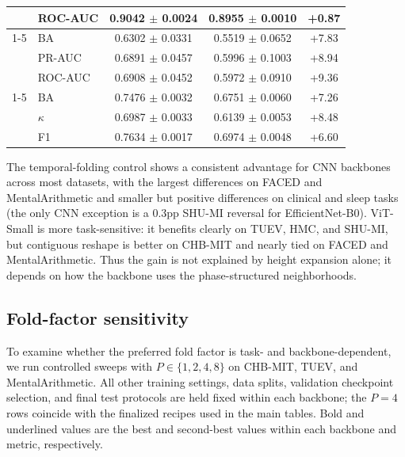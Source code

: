 \begin{table}[tbp]
\begin{tabular}{@{}l l c c c@{}}
 & ROC-AUC & 0.9042 $\pm$ 0.0024 & 0.8955 $\pm$ 0.0010 & +0.87 \\
\cmidrule(lr){1-5}
\multirow{3}{*}{SHU-MI} & BA & 0.6302 $\pm$ 0.0331 & 0.5519 $\pm$ 0.0652 & +7.83 \\
 & PR-AUC & 0.6891 $\pm$ 0.0457 & 0.5996 $\pm$ 0.1003 & +8.94 \\
 & ROC-AUC & 0.6908 $\pm$ 0.0452 & 0.5972 $\pm$ 0.0910 & +9.36 \\
\cmidrule(lr){1-5}
\multirow{3}{*}{HMC} & BA & 0.7476 $\pm$ 0.0032 & 0.6751 $\pm$ 0.0060 & +7.26 \\
 & $\kappa$ & 0.6987 $\pm$ 0.0033 & 0.6139 $\pm$ 0.0053 & +8.48 \\
 & F1 & 0.7634 $\pm$ 0.0017 & 0.6974 $\pm$ 0.0048 & +6.60 \\
\bottomrule\end{tabular}\end{table}

The temporal-folding control shows a consistent advantage for CNN backbones across
most datasets, with the largest differences on FACED and MentalArithmetic and
smaller but positive differences on clinical and sleep tasks (the only CNN
exception is a 0.3pp SHU-MI reversal for EfficientNet-B0). ViT-Small is more
task-sensitive: it benefits clearly on TUEV, HMC, and SHU-MI, but contiguous
reshape is better on CHB-MIT and nearly tied on FACED and MentalArithmetic.
Thus the gain is not explained by height expansion alone; it depends on how the
backbone uses the phase-structured neighborhoods.
\subsection{Fold-factor sensitivity}
\label{app:p-ablation}

To examine whether the preferred fold factor is task- and backbone-dependent,
we run controlled sweeps with $P\in\{1,2,4,8\}$ on CHB-MIT, TUEV, and
MentalArithmetic. All other training settings, data splits, validation
checkpoint selection, and final test protocols are held fixed within each
backbone; the $P=4$ rows coincide with the finalized recipes used in the main
tables. Bold and underlined values are the best and second-best values within
each backbone and metric, respectively.

